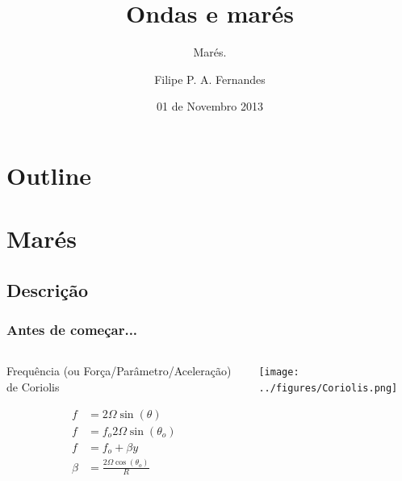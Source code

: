 \title[Aula 08]{Ondas e marés}
\subtitle{Marés.}
\author[Filipe Fernandes]{Filipe P. A. Fernandes}
\date[Novembro 2013]{01 de Novembro 2013}




\begin{frame}[plain]
  \titlepage
\end{frame}

\section*{Outline}
\begin{frame}
\tableofcontents
\end{frame}

\section{Marés}
\subsection{Descrição}

\begin{frame}

  \frametitle{Antes de começar...}
  \begin{columns}
    \begin{column}{0.5\textwidth}
  \small{
  Frequência (ou Força/Parâmetro/Aceleração) de Coriolis
  \begin{block}{}
    \begin{align}
      f &= 2\Omega\sin(\theta) \\
      f &= f_o 2\Omega\sin(\theta_o) \\
      f &= f_o + \beta y \\
      \beta &= \frac{2\Omega\cos(\theta_o)}{R}
    \end{align}
  \end{block}
  }
    \end{column}
    \begin{column}{0.5\textwidth}
      \begin{center}
        \texttt{[image: ../figures/Coriolis.png]}
      \end{center}
    \end{column}
  \end{columns}
\end{frame}

